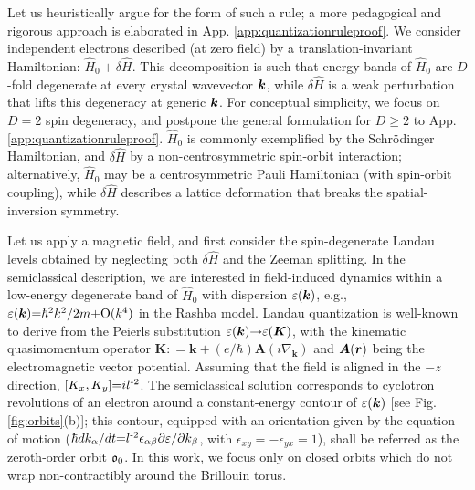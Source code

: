 \documentclass[aps, showpacs, twocolumn, notitlepage, superscriptaddress]{revtex4-1}
\begin{document}
Let us heuristically argue for the form of such a rule; a more pedagogical and rigorous approach is elaborated in App. \ref{app:quantizationruleproof}. We consider independent electrons described (at zero field) by a translation-invariant Hamiltonian: $\hat{H}_0{+}\delta \hat{H}$. This decomposition is such that energy bands of $\hat{H}_0$ are $D$-fold degenerate at every crystal wavevector $\boldsymbol{k}$, while $\delta \hat{H}$ is a weak perturbation that lifts this degeneracy at generic $\boldsymbol{k}$. For conceptual simplicity, we focus on $D{=}2$ spin degeneracy, and postpone the general formulation for $D{\geq}2$ to App. \ref{app:quantizationruleproof}.  $\hat{H}_0$ is commonly exemplified by  the Schr\"odinger Hamiltonian, and $\delta \hat{H}$ by a non-centrosymmetric spin-orbit interaction; alternatively, $\hat{H}_0$ may be a centrosymmetric Pauli Hamiltonian (with spin-orbit coupling), while $\delta \hat{H}$ describes a lattice deformation that breaks the spatial-inversion symmetry.

Let us apply a magnetic field, and first consider the spin-degenerate Landau levels obtained by neglecting both $\delta \hat{H}$ and the Zeeman splitting. In the  semiclassical description,  we are interested in  field-induced dynamics within a low-energy degenerate band of $\hat{H}_0$ with  dispersion $\varepsilon(\boldsymbol{k})$, e.g., $\varepsilon(\boldsymbol{k}){=}\hbar^2 k^2/2m{+}\text{O}(k^4)$ in the Rashba model.    Landau quantization is well-known to derive from the Peierls substitution $\varepsilon(\boldsymbol{k}){\rightarrow}\varepsilon(\boldsymbol{K})$\cite{peierls_substitution}, with the kinematic quasimomentum operator   $\boldsymbol{K}{:}{=}\boldsymbol{k}{+}(e/\hbar) \boldsymbol{A}(i\nabla_{\boldsymbol{k}})$ and $\boldsymbol{A}(\boldsymbol{r})$ being the electromagnetic vector potential. Assuming that the field is aligned in the ${-}z$ direction, $[K_x,K_y]{=}il^{\text{-}2}$. The semiclassical solution corresponds to  cyclotron revolutions of an electron around a constant-energy contour of $\varepsilon(\boldsymbol{k})$ [see Fig. \ref{fig:orbits}(b)]; this contour, equipped with an orientation given by the equation of motion ($ \hbar dk_{\alpha}/dt {=} l^{\text{-}2} \epsilon_{\alpha\beta}\partial \varepsilon/\partial k_{\beta} $, with $\epsilon_{xy}{=}{-}\epsilon_{yx}{=}1$), shall be referred as the zeroth-order orbit $\mathfrak{o}_0$.  In this work, we focus only on closed orbits which do not wrap non-contractibly around the Brillouin torus.
\end{document}

